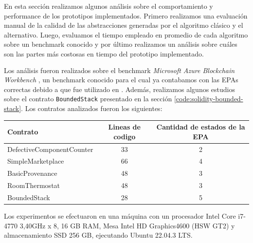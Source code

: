 En esta sección realizamos algunos análisis sobre el comportamiento y performance de los prototipos implementados.
Primero realizamos una evaluación manual de la calidad de las abstracciones generadas por el algoritmo clásico y el alternativo.
Luego, evaluamos el tiempo empleado en promedio de cada algoritmo sobre un benchmark conocido y por último realizamos un análisis sobre cuáles son las partes más costosas en tiempo del prototipo implementado.

Los análisis fueron realizados sobre el benchmark \textit{Microsoft Azure Blockchain Workbench} \cite{azure-benchmark}, un benchmark conocido para el cual ya contabamos con las EPAs correctas debido a que fue utilizado en \cite{predicate-abstraction-for-smart-contract-validation} \cite{torres}.
Además, realizamos algunos estudios sobre el contrato \texttt{BoundedStack} presentado en la sección \ref{code:solidity-bounded-stack}.
Los contratos analizados fueron los siguientes:

\begin{center}
    \begin{tabular}{|l|c|c|}
        \hline
        \textbf{Contrato}         & \textbf{Lineas de codigo} & \textbf{Cantidad de estados de la EPA} \\
        \hline
        DefectiveComponentCounter & 33                        & 2                                      \\
        \hline
        SimpleMarketplace         & 66                        & 4                                      \\
        \hline
        BasicProvenance           & 48                        & 3                                      \\
        \hline
        RoomThermostat            & 48                        & 3                                      \\
        \hline
        BoundedStack              & 28                        & 5                                      \\
        \hline
    \end{tabular}
\end{center}

Los experimentos se efectuaron en una máquina con un procesador Intel Core i7-4770 \@ 3,40GHz x 8, 16 GB RAM, Mesa Intel HD Graphics4600 (HSW GT2) y almacenamiento SSD 256 GB, ejecutando Ubuntu 22.04.3 LTS.

